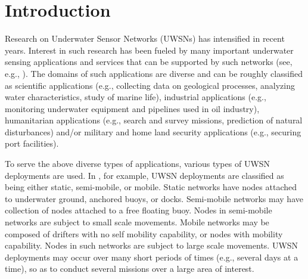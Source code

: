 
\section{Introduction}

%
%
%
%
%

Research on Underwater Sensor Networks (UWSNs) has intensified in recent
years.
Interest in such research has been fueled by many important underwater
sensing applications and services that can be supported by such networks
(see, e.g., \cite{akyildiz2005underwater,heidemann2012underwater}).
%
The domains of such applications are diverse and can be roughly classified as
scientific applications (e.g., collecting data on geological processes,
analyzing water characteristics, study of marine life),
industrial applications (e.g., monitoring underwater equipment and pipelines
used in oil industry),
humanitarian applications (e.g., search and survey missions, prediction of
natural disturbances) and/or
military and home land security applications (e.g., securing port facilities).

To serve the above diverse types of applications, various types
of UWSN deployments are used.
%
In \cite{heidemann2012underwater}, for example, UWSN deployments are
classified as being either static, semi-mobile, or mobile.
%
Static networks have nodes attached to underwater ground,
anchored buoys, or docks.
%
Semi-mobile networks may have collection of nodes attached to a
free floating buoy. Nodes in semi-mobile networks are subject to small scale
movements.
%
Mobile networks may be composed of drifters with no self mobility
capability, or nodes with mobility capability. Nodes in such networks
are subject to large scale movements.
%
UWSN deployments may occur over many short periods of times (e.g.,
several days at a time), so as to conduct several missions over
a large area of interest.
%

